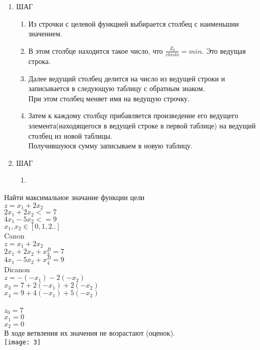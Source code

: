 \begin{enumerate}
  \item ШАГ\\
  \begin{enumerate}
    \item Из строчки с целевой функцией выбирается столбец с наименьшии значением.
    \item В этом столбце находится такое число, что $ \frac{Z_0}{chislo} = min$. Это ведущая строка.
    \item Далее ведущий столбец делится на число из ведущей строки и записывается в следующую таблицу с обратным знаком.\\
    При этом столбец меняет имя на ведущую строчку.
    \item Затем к каждому столбцу прибавляется произведение его
    ведущего элемента(находящегося в ведущей строке в первой таблице) на ведущий столбец из новой таблицы.\\
    Получившуюся сумму записываем в новую таблицу.
  \end{enumerate}
  \item ШАГ\\
    \begin{enumerate}
      \item
    \end{enumerate}

\end{enumerate}

Найти максимальное значание функции цели \\
$z= x_1 + 2 x_2$\\
$2x_1 + 2x_2 <= 7$\\
$4x_1 - 5x_2 <= 9$\\
$x_1 , x_2 \in [0,1,2..]$\\

Canon\\
$z = x_1 + 2 x_2 $ \\
$2x_1 + 2x_2 + x_3^B = 7$\\
$4x_1 - 5x_2 + x_4^B = 9$\\

Dicanon\\
$z =  -(-x_1) -  2 (-x_2)$\\
$x_3 = 7 +2(-x_1)  + 2 (-x_2)$\\
$x_4 = 9 +4(-x_1)  + 5 (-x_2)$\\
\\
$ z_0 = 7 $\\
$x_1=0$\\
$x_2 =0  $\\

В ходе ветвления их значения не возрастают (оценок).\\
\texttt{[image: 3]}
